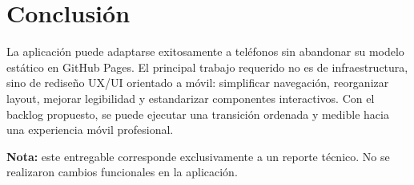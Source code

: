 \documentclass[12pt,a4paper]{article}
\begin{document}
\section{Conclusión}
La aplicación puede adaptarse exitosamente a teléfonos sin abandonar su modelo estático en GitHub Pages. El principal trabajo requerido no es de infraestructura, sino de rediseño UX/UI orientado a móvil: simplificar navegación, reorganizar layout, mejorar legibilidad y estandarizar componentes interactivos. Con el backlog propuesto, se puede ejecutar una transición ordenada y medible hacia una experiencia móvil profesional.

\vspace{0.7cm}
\noindent\textbf{Nota:} este entregable corresponde exclusivamente a un reporte técnico. No se realizaron cambios funcionales en la aplicación.
\end{document}
